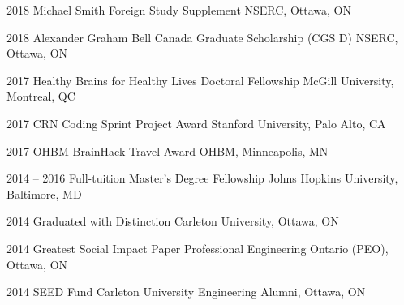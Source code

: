 \documentclass[]{friggeri-cv} %
\begin{document}
\begin{entrylist}
\vspace{-7pt}

\entry
{2018}
{Michael Smith Foreign Study Supplement}
{NSERC, Ottawa, ON}
{}
\vspace{-7pt}

\entry
{2018}
{Alexander Graham Bell Canada Graduate Scholarship (CGS D)}
{NSERC, Ottawa, ON}
{}
\vspace{-7pt}

\entry
{2017}
{Healthy Brains for Healthy Lives Doctoral Fellowship}
{McGill University, Montreal, QC}
{}
\vspace{-7pt}

\entry
{2017}
{CRN Coding Sprint Project Award}
{Stanford University, Palo Alto, CA}
{}
\vspace{-7pt}

\entry
{2017}
{OHBM BrainHack Travel Award}
{OHBM, Minneapolis, MN}
{}
\vspace{-7pt}

\entry
{2014 -- 2016}
{Full-tuition Master's Degree Fellowship}
{Johns Hopkins University, Baltimore, MD}
{}
\vspace{-7pt}

\entry
{2014}
{Graduated with Distinction}
{Carleton University, Ottawa, ON}
{}
\vspace{-7pt}

\entry
{2014}
{Greatest Social Impact Paper}
{Professional Engineering Ontario (PEO), Ottawa, ON}
{}
\vspace{-7pt}

\entry
{2014}
{SEED Fund}
{Carleton University Engineering Alumni, Ottawa, ON}
{}
\vspace{-7pt}
\end{entrylist}
\end{document}
